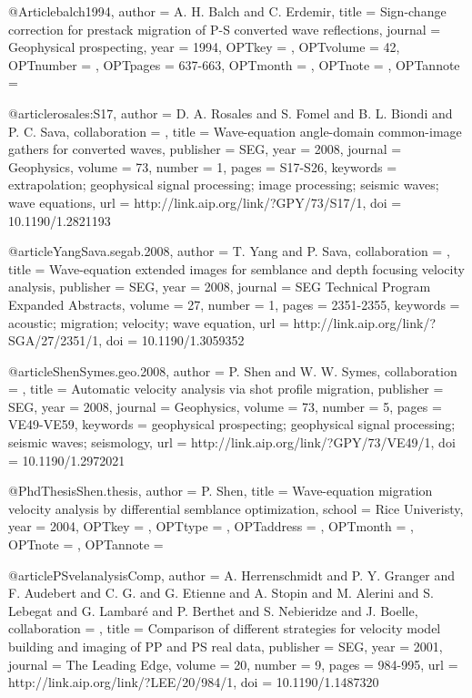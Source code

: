 {@Article{balch1994,
  author = 	 {A. H. Balch and C. Erdemir},
  title = 	 {Sign-change correction for prestack migration of P-S
                  converted wave reflections},
  journal = 	 {Geophysical prospecting},
  year = 	 {1994},
  OPTkey = 	 {},
  OPTvolume = 	 {42},
  OPTnumber = 	 {},
  OPTpages = 	 {637-663},
  OPTmonth = 	 {},
  OPTnote = 	 {},
  OPTannote = 	 {}
}


@article{rosales:S17,
author = {D. A. Rosales and S. Fomel and B. L. Biondi and P. C. Sava},
collaboration = {},
title = {Wave-equation angle-domain common-image gathers for converted waves},
publisher = {SEG},
year = {2008},
journal = {Geophysics},
volume = {73},
number = {1},
pages = {S17-S26},
keywords = {extrapolation; geophysical signal processing; image processing; seismic waves; wave equations},
url = {http://link.aip.org/link/?GPY/73/S17/1},
doi = {10.1190/1.2821193}
}




@article{YangSava.segab.2008,
author = {T. Yang and P. Sava},
collaboration = {},
title = {Wave-equation extended images for semblance and depth focusing velocity analysis},
publisher = {SEG},
year = {2008},
journal = {SEG Technical Program Expanded Abstracts},
volume = {27},
number = {1},
pages = {2351-2355},
keywords = {acoustic; migration; velocity; wave equation},
url = {http://link.aip.org/link/?SGA/27/2351/1},
doi = {10.1190/1.3059352}
}



@article{ShenSymes.geo.2008,
author = {P. Shen and W. W. Symes},
collaboration = {},
title = {Automatic velocity analysis via shot profile migration},
publisher = {SEG},
year = {2008},
journal = {Geophysics},
volume = {73},
number = {5},
pages = {VE49-VE59},
keywords = {geophysical prospecting; geophysical signal processing; seismic waves; seismology},
url = {http://link.aip.org/link/?GPY/73/VE49/1},
doi = {10.1190/1.2972021}
}






@PhdThesis{Shen.thesis,
  author = 	 {P. Shen},
  title = 	 {Wave-equation migration velocity analysis by
                  differential semblance optimization},
  school = 	 {Rice Univeristy},
  year = 	 {2004},
  OPTkey = 	 {},
  OPTtype = 	 {},
  OPTaddress = 	 {},
  OPTmonth = 	 {},
  OPTnote = 	 {},
  OPTannote = 	 {}
}

@article{PSvelanalysisComp,
author = {A. Herrenschmidt and P. Y. Granger and
                  F. Audebert and C. G. and
                  G. Etienne and A. Stopin and M.
                  Alerini and S. Lebegat and G. Lambar\'{e}
                  and P. Berthet and S. Nebieridze and
                  J. Boelle},
collaboration = {},
title = {Comparison of different strategies for velocity model
                  building and imaging of {PP} and {PS} real data},
publisher = {SEG},
year = {2001},
journal = {The Leading Edge},
volume = {20},
number = {9},
pages = {984-995},
url = {http://link.aip.org/link/?LEE/20/984/1},
doi = {10.1190/1.1487320}
}









}
